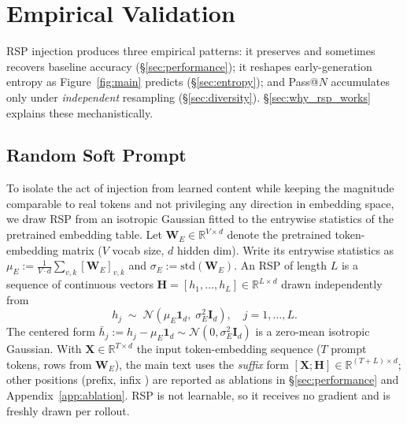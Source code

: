 
\section{Empirical Validation}\label{sec:experimental_analysis}

RSP injection produces three empirical patterns: it preserves and sometimes recovers baseline accuracy (\S\ref{sec:performance}); it reshapes early-generation entropy as Figure~\ref{fig:main} predicts (\S\ref{sec:entropy}); and Pass@$N$ accumulates only under \emph{independent} resampling (\S\ref{sec:diversity}). \S\ref{sec:why_rsp_works} explains these mechanistically.

\subsection{Random Soft Prompt}\label{sec:rsp_definition}

To isolate the act of injection from learned content while keeping the magnitude comparable to real tokens and not privileging any direction in embedding space, we draw RSP from an isotropic Gaussian fitted to the entrywise statistics of the pretrained embedding table. Let $\mathbf{W}_E \in \mathbb{R}^{V\times d}$ denote the pretrained token-embedding matrix ($V$ vocab size, $d$ hidden dim). Write its entrywise statistics as $\mu_E := \tfrac{1}{V\cdot d}\sum_{v,k}[\mathbf{W}_E]_{v,k}$ and $\sigma_E := \mathrm{std}(\mathbf{W}_E)$. An RSP of length $L$ is a sequence of continuous vectors $\mathbf{H} = [h_1,\dots,h_L]\in\mathbb{R}^{L\times d}$ drawn independently from
\begin{equation}\label{eq:rsp_def}
h_j \;\sim\; \mathcal{N}(\mu_E\mathbf{1}_d,\;\sigma_E^2\mathbf{I}_d), \quad j=1,\dots,L.
\end{equation}
The centered form $\bar h_j := h_j - \mu_E\mathbf{1}_d \sim \mathcal{N}(0,\sigma_E^2\mathbf{I}_d)$ is a zero-mean isotropic Gaussian. With $\mathbf{X} \in \mathbb{R}^{T\times d}$ the input token-embedding sequence ($T$ prompt tokens, rows from $\mathbf{W}_E$), the main text uses the \emph{suffix} form $[\mathbf{X};\mathbf{H}] \in \mathbb{R}^{(T+L)\times d}$; other positions (prefix, infix \citep{kang2025model, xu2025softcot, ye2025thinking, zhang2025memgen}) are reported as ablations in \S\ref{sec:performance} and Appendix~\ref{app:ablation}. RSP is not learnable, so it receives no gradient and is freshly drawn per rollout.

